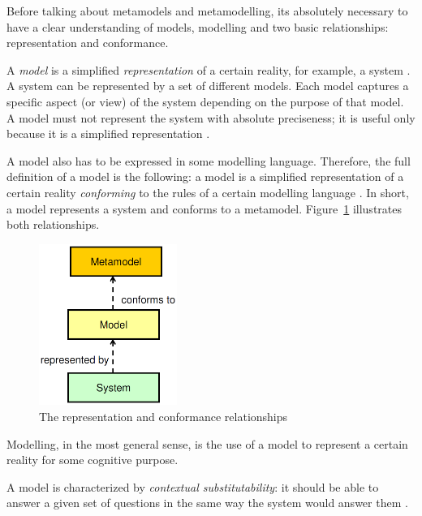 Before talking about metamodels and metamodelling, its absolutely necessary to have a clear understanding of models, modelling and two basic relationships: representation and conformance. 

A \textit{model} is a simplified \textit{representation} of a certain reality, for example, a system \cite{Genova09}.
A system can be represented by a set of different models.
Each model captures a specific aspect (or view) of the system depending on the purpose of that model.
A model must not represent the system with absolute preciseness; it is useful only because it is a simplified representation \cite{Genova09}.

A model also has to be expressed in some modelling language.
Therefore, the full definition of a model is the following: a model is a simplified representation of a certain reality \textit{conforming} to the rules of a certain modelling language \cite{Genova09}. In short, a model represents a system and conforms to a metamodel. Figure~\ref{figure:representation-and-conformance} illustrates both relationships.

\begin{figure}[h]
	\centering
	\includegraphics[width=0.4\textwidth]{images/representation-and-conformance-relationships.png}
	\caption{The representation and conformance relationships \cite{Genova09}}
	\label{figure:representation-and-conformance}
\end{figure}

Modelling, in the most general sense, is the use of a model to represent a certain reality for some cognitive purpose.

A model is characterized by \textit{contextual substitutability}: it should be able to answer a given set of questions in the same way the system would answer them \cite{Genova09}.

